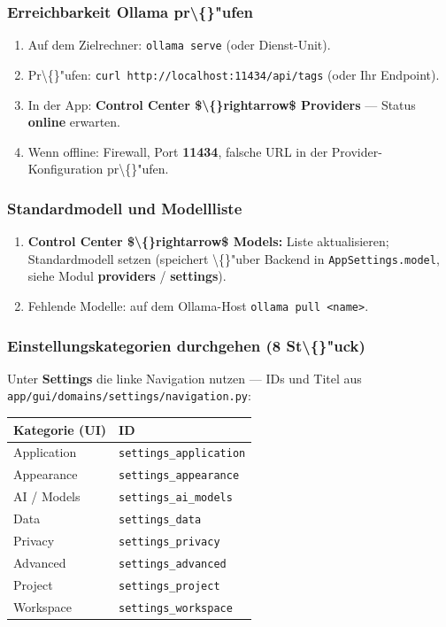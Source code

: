 \subsubsection{Erreichbarkeit Ollama pr\textbackslash\{\}"ufen}

\begin{enumerate}
\item Auf dem Zielrechner: \texttt{ollama serve} (oder Dienst-Unit).
\item Pr\textbackslash\{\}"ufen: \texttt{curl http://localhost:11434/api/tags} (oder Ihr Endpoint).
\item In der App: \textbf{Control Center \$\textbackslash\{\}rightarrow\$ Providers} --- Status \textbf{online} erwarten.
\item Wenn offline: Firewall, Port \textbf{11434}, falsche URL in der Provider-Konfiguration pr\textbackslash\{\}"ufen.
\end{enumerate}

\subsubsection{Standardmodell und Modellliste}

\begin{enumerate}
\item \textbf{Control Center \$\textbackslash\{\}rightarrow\$ Models:} Liste aktualisieren; Standardmodell setzen (speichert \textbackslash\{\}"uber Backend in \texttt{AppSettings.model}, siehe Modul \textbf{providers} / \textbf{settings}).
\item Fehlende Modelle: auf dem Ollama-Host \texttt{ollama pull <name>}.
\end{enumerate}

\subsubsection{Einstellungskategorien durchgehen (8 St\textbackslash\{\}"uck)}

Unter \textbf{Settings} die linke Navigation nutzen --- IDs und Titel aus \texttt{app/gui/domains/settings/navigation.py}:

\begin{center}
\begin{tabular}{ll}
\hline
Kategorie (UI) & ID \\
\hline
Application & \texttt{settings\_application} \\
Appearance & \texttt{settings\_appearance} \\
AI / Models & \texttt{settings\_ai\_models} \\
Data & \texttt{settings\_data} \\
Privacy & \texttt{settings\_privacy} \\
Advanced & \texttt{settings\_advanced} \\
Project & \texttt{settings\_project} \\
Workspace & \texttt{settings\_workspace} \\
\hline
\end{tabular}
\end{center}

